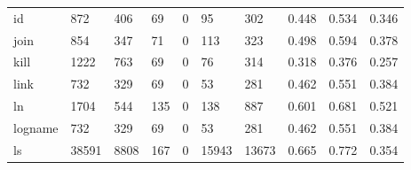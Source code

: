 \begin{longtable}{lp{2.0cm}p{2.0cm}p{2.0cm}p{2.0cm}p{2.0cm}p{2.0cm}p{2.0cm}p{2.0cm}p{2.0cm}}
id        &                    872 &                                406 &                                69 &                                0 &                                95 &                             302 &                                0.448 &                                  0.534 &                                0.346 \\
join      &                    854 &                                347 &                                71 &                                0 &                               113 &                             323 &                                0.498 &                                  0.594 &                                0.378 \\
kill      &                   1222 &                                763 &                                69 &                                0 &                                76 &                             314 &                                0.318 &                                  0.376 &                                0.257 \\
link      &                    732 &                                329 &                                69 &                                0 &                                53 &                             281 &                                0.462 &                                  0.551 &                                0.384 \\
ln        &                   1704 &                                544 &                               135 &                                0 &                               138 &                             887 &                                0.601 &                                  0.681 &                                0.521 \\
logname   &                    732 &                                329 &                                69 &                                0 &                                53 &                             281 &                                0.462 &                                  0.551 &                                0.384 \\
ls        &                  38591 &                               8808 &                               167 &                                0 &                             15943 &                           13673 &                                0.665 &                                  0.772 &                                0.354 \\

\end{longtable}

